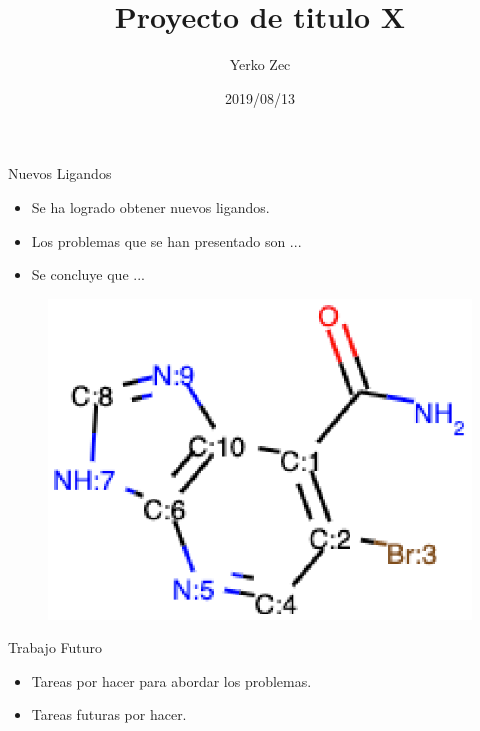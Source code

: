 \documentclass{beamer}
\title{Proyecto de titulo X}
\author{Yerko Zec}
\institute[]{FI - UNAB}
\date{2019/08/13}
\begin{document}
\begin{frame}[plain]
  \titlepage
\end{frame}

\addtocounter{framenumber}{-1}

\begin{frame}{Nuevos Ligandos}
\begin{itemize}
 \item Se ha logrado obtener nuevos ligandos.
 \item Los problemas que se han presentado son ...
 \item Se concluye que ...
\end{itemize}

\begin{figure}
\includegraphics[width=0.3\linewidth]{newLigand}
\end{figure}
\end{frame}

\begin{frame}{Trabajo Futuro}
\begin{itemize}
 \item Tareas por hacer para abordar los problemas.
 \item Tareas futuras por hacer.
\end{itemize}
\end{frame}
\end{document}
